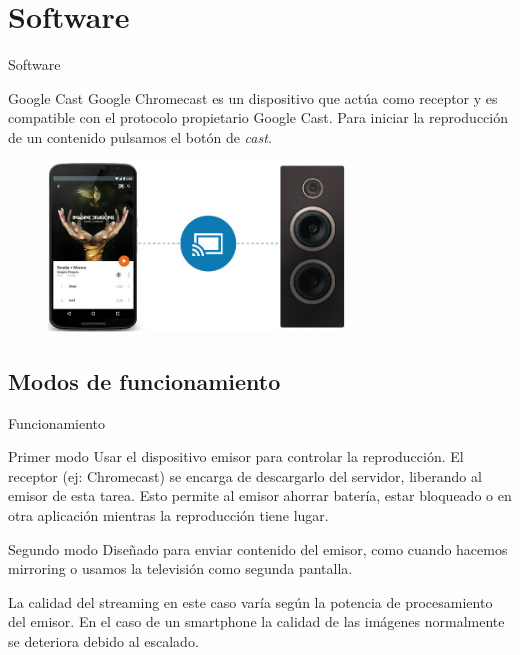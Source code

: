 \section{Software}

\begin{frame}{Software}
	\begin{block}{Google Cast}
		Google Chromecast es un dispositivo que actúa como receptor y es compatible con el protocolo propietario Google Cast.
		Para iniciar la reproducción de un contenido pulsamos el botón de \textit{cast}.
	\end{block}

	\begin{figure}[h]
		\centering
		\includegraphics[width=0.7\textwidth]{./Imagenes/cast-speaker.jpg}
	\end{figure}
\end{frame}



\subsection{Modos de funcionamiento}

\begin{frame}{Funcionamiento}
	\begin{block}{Primer modo}
		Usar el dispositivo emisor para controlar la reproducción. El receptor (ej: Chromecast) se encarga de descargarlo del servidor, liberando al emisor de esta tarea. 
		Esto permite al emisor ahorrar batería, estar bloqueado o en otra aplicación mientras la reproducción tiene lugar.
	\end{block}
	
	\begin{block}{Segundo modo}
		Diseñado para enviar contenido del emisor, como cuando hacemos mirroring o usamos la televisión como segunda pantalla.
		
		La calidad del streaming en este caso varía según la potencia de procesamiento del emisor. En el caso de un smartphone la calidad
		de las imágenes normalmente se deteriora debido al escalado.
	\end{block}
\end{frame}


